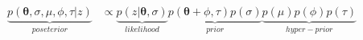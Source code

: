 \documentclass[varwidth=\linewidth]{standalone}
\begin{document}
$$\begin{aligned}
\underset{poseterior}{\underbrace{p(\mathbf{\theta}, \sigma, \mu, \phi, \tau|z)}} &\propto
    \underset{likelihood}{\underbrace{p(z|\mathbf{\theta}, \sigma)}}
    \underset{prior}{\underbrace{p(\mathbf{\theta} + \phi, \tau)p(\sigma)}}
    \underset{hyper-prior}{\underbrace{p(\mu)p(\phi)p(\tau)}}
\end{aligned}$$
\end{document}
